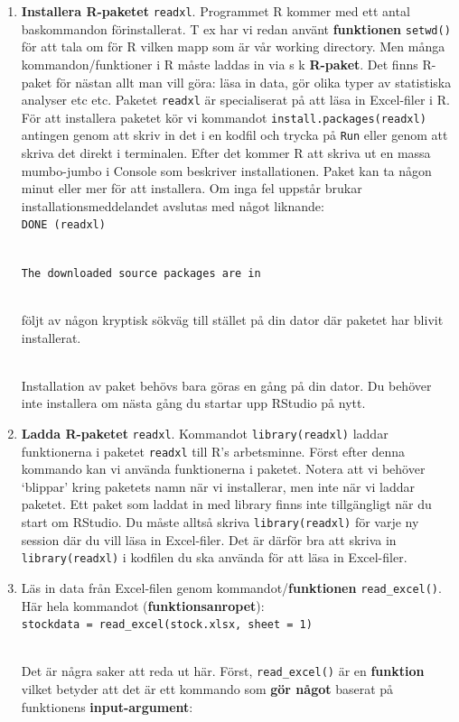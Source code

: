 \documentclass[
  letterpaper,
  DIV=11,
  numbers=noendperiod,
  oneside]{scrartcl}
\begin{document}
\begin{enumerate}
\def\labelenumi{\arabic{enumi}.}
\item
  \textbf{Installera R-paketet} \texttt{readxl}. Programmet R kommer med
  ett antal baskommandon förinstallerat. T ex har vi redan använt
  \textbf{funktionen} \texttt{setwd()} för att tala om för R vilken mapp
  som är vår working directory. Men många kommandon/funktioner i R måste
  laddas in via s k \textbf{R-paket}. Det finns R-paket för nästan allt
  man vill göra: läsa in data, gör olika typer av statistiska analyser
  etc etc. Paketet \texttt{readxl} är specialiserat på att läsa in
  Excel-filer i R. För att installera paketet kör vi kommandot
  \texttt{install.packages(\textquotesingle{}readxl\textquotesingle{})}
  antingen genom att skriv in det i en kodfil och trycka på \texttt{Run}
  eller genom att skriva det direkt i terminalen. Efter det kommer R att
  skriva ut en massa mumbo-jumbo i Console som beskriver installationen.
  Paket kan ta någon minut eller mer för att installera. Om inga fel
  uppstår brukar installationsmeddelandet avslutas med något liknande:\\
  \texttt{DONE\ (readxl)}\strut \\
  \texttt{The\ downloaded\ source\ packages\ are\ in}\strut \\
  följt av någon kryptisk sökväg till stället på din dator där paketet
  har blivit installerat.\\
  \strut \\
  Installation av paket behövs bara göras en gång på din dator. Du
  behöver inte installera om nästa gång du startar upp RStudio på nytt.
\item
  \textbf{Ladda R-paketet} \texttt{readxl}. Kommandot
  \texttt{library(readxl)} laddar funktionerna i paketet \texttt{readxl}
  till R's arbetsminne. Först efter denna kommando kan vi använda
  funktionerna i paketet. Notera att vi behöver `blippar' kring paketets
  namn när vi installerar, men inte när vi laddar paketet. Ett paket som
  laddat in med library finns inte tillgängligt när du start om RStudio.
  Du måste alltså skriva \texttt{library(readxl)} för varje ny session
  där du vill läsa in Excel-filer. Det är därför bra att skriva in
  \texttt{library(readxl)} i kodfilen du ska använda för att läsa in
  Excel-filer.
\item
  Läs in data från Excel-filen genom kommandot/\textbf{funktionen}
  \texttt{read\_excel()}. Här hela kommandot
  (\textbf{funktionsanropet}):\\
  \texttt{stockdata\ =\ read\_excel(\textquotesingle{}stock.xlsx\textquotesingle{},\ sheet\ =\ 1)}\strut \\
  Det är några saker att reda ut här. Först, \texttt{read\_excel()} är
  en \textbf{funktion} vilket betyder att det är ett kommando som
  \textbf{gör något} baserat på funktionens \textbf{input-argument}:


\end{enumerate}
\end{document}
